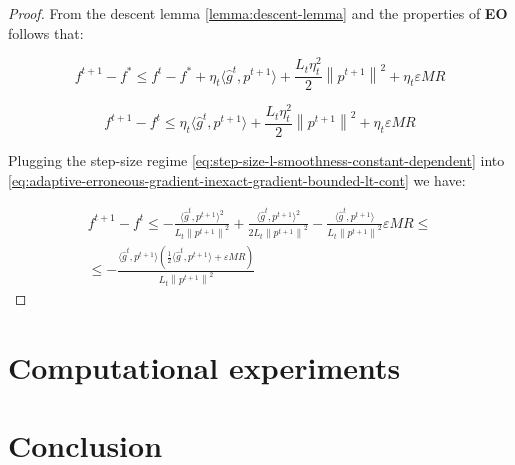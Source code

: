 \documentclass[runningheads, draft]{llncs}
\newcommand{\norm}[1]{\left\lVert#1\right\rVert}
\newcommand{\vprod}[1]{\langle#1\rangle}
\newcommand{\errgrad}{\hat{g}}
\begin{document}
\begin{proof}
    From the descent lemma \eqref{lemma:descent-lemma} and
    the properties of \textbf{EO} follows that:

    \begin{equation}\label{eq:adaptive-erroneous-gradient-inexact-gradient-bounded-lt}
        f^{t+1} - f^* \leqslant f^t - f^* + \eta_t \vprod{\errgrad^t, p^{t+1}} +
        \frac{L_t \eta_t^2}{2} \norm{p^{t+1}}^2 + \eta_t \varepsilon M R
    \end{equation}

    \begin{equation}\label{eq:adaptive-erroneous-gradient-inexact-gradient-bounded-lt-cont}
        f^{t+1} - f^t \leqslant \eta_t \vprod{\errgrad^t, p^{t+1}} +
        \frac{L_t \eta_t^2}{2} \norm{p^{t+1}}^2  + \eta_t \varepsilon M R
    \end{equation}

    Plugging the step-size regime
    \eqref{eq:step-size-l-smoothness-constant-dependent} into
    \eqref{eq:adaptive-erroneous-gradient-inexact-gradient-bounded-lt-cont}
    we have:

    \begin{equation}
        \begin{split}
            f^{t+1} - f^t \leqslant
            -\frac{\vprod{\errgrad^t, p^{t+1}}^2}{L_t\norm{p^{t+1}}^2} +
            \frac{\vprod{\errgrad^t, p^{t+1}}^2}{2L_t\norm{p^{t+1}}^2}
            -\frac{\vprod{\errgrad^t, p^{t+1}}}{L_t\norm{p^{t+1}}^2}
            \varepsilon M R \leqslant \\
            \leqslant -\frac{\vprod{\errgrad^t, p^{t+1}}(\frac{1}{2}\vprod{\errgrad^t, p^{t+1}}
                + \varepsilon M R)}{L_t\norm{p^{t+1}}^2}
        \end{split}
    \end{equation}

\end{proof}
%
\section{Computational experiments}
%
\section{Conclusion}
%
\end{document}
